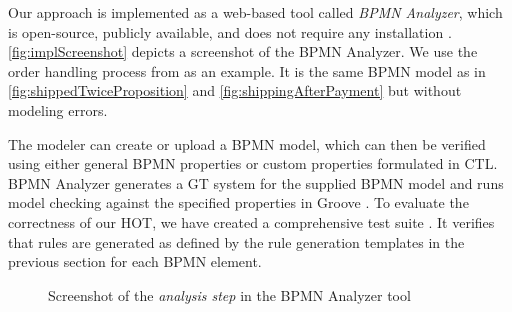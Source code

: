 \documentclass{lmcs} %
\begin{document}
Our approach is implemented as a web-based tool called \textit{BPMN Analyzer}, which is open-source, publicly available, and does not require any installation \cite{timkrauterLMCS2024Artifacts2023, krauterFormalizationAnalysisBPMN2023}.
\autoref{fig:implScreenshot} depicts a screenshot of the BPMN Analyzer.
We use the order handling process from \cite{ruckerPracticalProcessAutomation2021} as an example.
It is the same BPMN model as in \autoref{fig:shippedTwiceProposition} and \autoref{fig:shippingAfterPayment} but without modeling errors.

The modeler can create or upload a BPMN model, which can then be verified using either general BPMN properties or custom properties formulated in CTL.
BPMN Analyzer generates a GT system for the supplied BPMN model and runs model checking against the specified properties in Groove \cite{kastenbergModelCheckingDynamic2006}. 
To evaluate the correctness of our HOT, we have created a comprehensive test suite \cite{timkrauterLMCS2024Artifacts2023}.
It verifies that rules are generated as defined by the rule generation templates in the previous section for each BPMN element.

\begin{figure}[ht]
    \centering
    \caption{Screenshot of the \textit{analysis step} in the BPMN Analyzer tool}
    \label{fig:implScreenshot}
\end{figure}
\end{document}
